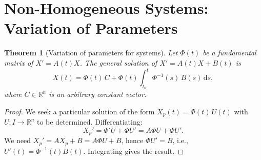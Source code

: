 \documentclass[12pt,a4paper,openany]{book}
\theoremstyle{definition}
\theoremstyle{plain}
\newtheorem{theorem}[definition]{Theorem}
\theoremstyle{remark}
\newcommand{\R}{\mathbb{R}}
\newcommand{\dd}{\mathrm{d}}
\begin{document}
\section{Non-Homogeneous Systems: Variation of Parameters}
\label{sec:sys-var-params}

\begin{theorem}[Variation of parameters for systems]\label{thm:var-params-sys}
Let $\Phi(t)$ be a fundamental matrix of $X'=A(t)X$.  The general
solution of $X'=A(t)X+B(t)$ is
\begin{equation}\label{eq:var-params-sys}
  X(t) = \Phi(t)\,C + \Phi(t)\int_{t_0}^{t}\Phi^{-1}(s)\,B(s)\,\dd s,
\end{equation}
where $C\in\R^n$ is an arbitrary constant vector.
\end{theorem}

\begin{proof}
We seek a particular solution of the form $X_p(t) = \Phi(t)\,U(t)$
with $U:I\to\R^n$ to be determined.  Differentiating:
\[
  X_p' = \Phi' U + \Phi U' = A\Phi U + \Phi U'.
\]
We need $X_p' = AX_p + B = A\Phi U + B$, hence $\Phi U' = B$,
i.e., $U'(t) = \Phi^{-1}(t)B(t)$.  Integrating gives the result.
\end{proof}
\end{document}
